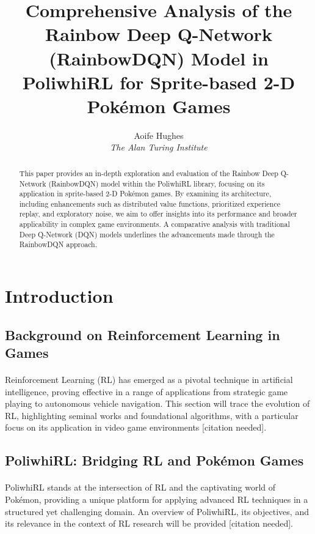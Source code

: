 \documentclass[12pt,a4paper]{article}
\title{Comprehensive Analysis of the Rainbow Deep Q-Network (RainbowDQN) Model in PoliwhiRL for Sprite-based 2-D Pokémon Games}
\author{Aoife Hughes \\ \textit{The Alan Turing Institute}}
\date{}
\begin{document}
\maketitle

\begin{abstract}
This paper provides an in-depth exploration and evaluation of the Rainbow Deep Q-Network (RainbowDQN) model within the PoliwhiRL library, focusing on its application in sprite-based 2-D Pokémon games. By examining its architecture, including enhancements such as distributed value functions, prioritized experience replay, and exploratory noise, we aim to offer insights into its performance and broader applicability in complex game environments. A comparative analysis with traditional Deep Q-Network (DQN) models underlines the advancements made through the RainbowDQN approach.
\end{abstract}

\section{Introduction}
\subsection{Background on Reinforcement Learning in Games}
\paragraph{}
Reinforcement Learning (RL) has emerged as a pivotal technique in artificial intelligence, proving effective in a range of applications from strategic game playing to autonomous vehicle navigation. This section will trace the evolution of RL, highlighting seminal works and foundational algorithms, with a particular focus on its application in video game environments [citation needed].

\subsection{PoliwhiRL: Bridging RL and Pokémon Games}
\paragraph{}
PoliwhiRL stands at the intersection of RL and the captivating world of Pokémon, providing a unique platform for applying advanced RL techniques in a structured yet challenging domain. An overview of PoliwhiRL, its objectives, and its relevance in the context of RL research will be provided [citation needed].
\end{document}

